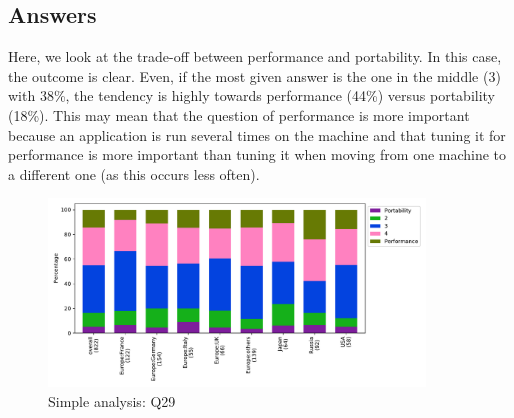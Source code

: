 
\subsection{Answers}


Here, we look at the trade-off between performance and portability. In this case,
the outcome is clear. Even, if the most given answer is the one in the middle (3)
with 38\%, the tendency is highly towards performance (44\%) versus portability
(18\%). This may mean that the question of performance is more important because an
application is run several times on the machine and that tuning it for performance
is more important than tuning it when moving from one machine to a different one
(as this occurs less often).  

\begin{figure}[htb]
\begin{center}
\includegraphics[width=10cm]{../pdfs/Q29.pdf}
\caption{Simple analysis: Q29}
\label{fig:Q29}
\end{center}
\end{figure}
